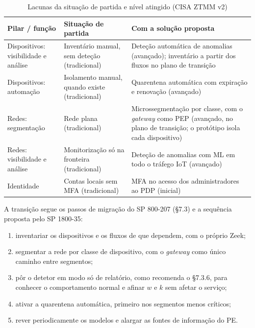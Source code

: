 \documentclass[conference,a4paper]{IEEEtran}
\begin{document}
\begin{table}[H]
\caption{Lacunas da situação de partida e nível atingido (CISA ZTMM v2)}\label{tab:zta_cisa}
\centering\footnotesize
\begin{tabular}{@{}>{\raggedright\arraybackslash}p{}>{\raggedright\arraybackslash}p{}>{\raggedright\arraybackslash}p{}@{}}
\toprule
Pilar / função & Situação de partida & Com a solução proposta \\
\midrule
Dispositivos: visibilidade e análise & Inventário manual, sem deteção (tradicional) & Deteção automática de anomalias (avançado); inventário a partir dos fluxos no plano de transição \\
Dispositivos: automação & Isolamento manual, quando existe (tradicional) & Quarentena automática com expiração e renovação (avançado) \\
Redes: segmentação & Rede plana (tradicional) & Microssegmentação por classe, com o \textit{gateway} como PEP (avançado, no plano de transição; o protótipo isola cada dispositivo) \\
Redes: visibilidade e análise & Monitorização só na fronteira (tradicional) & Deteção de anomalias com ML em todo o tráfego IoT (avançado) \\
Identidade & Contas locais sem MFA (tradicional) & MFA no acesso dos administradores ao PDP (inicial) \\
\bottomrule
\end{tabular}
\end{table}

A transição segue os passos de migração do SP 800-207 (§7.3) e a sequência proposta pelo
SP 1800-35:
\begin{enumerate}
  \item inventariar os dispositivos e os fluxos de que dependem, com o próprio Zeek;
  \item segmentar a rede por classe de dispositivo, com o \textit{gateway} como único
  caminho entre segmentos;
  \item pôr o detetor em modo só de relatório, como recomenda o §7.3.6, para conhecer o
  comportamento normal e afinar $w$ e $k$ sem afetar o serviço;
  \item ativar a quarentena automática, primeiro nos segmentos menos críticos;
  \item rever periodicamente os modelos e alargar as fontes de informação do PE.
\end{enumerate}
\end{document}

